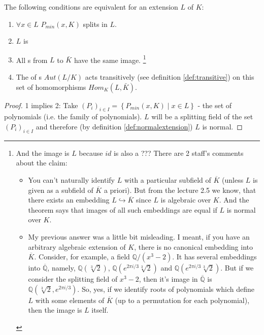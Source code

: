 \begin{theorem}
  The following conditions are equivalent for an extension $L$ of $K$:
  \begin{enumerate}
  \item $\forall x \in L$ $P_{min}\left(x, K\right)$ splits in $L$.
  \item $L$ is 
  \item All s from $L$ to $\bar{K}$ have the
    same image.
    \footnote{
      And the image is $L$ because $id$ is also a
      ??? There are 2 staff's comments about the claim:
      \begin{itemize}
      \item You can't naturally identify $L$ with a particular
        subfield of $\overline{K}$ (unless $L$ is given as a
        subfield of $\overline{K}$ a priori). But from the lecture
        2.5 we know, that there exists an embedding $L
        \hookrightarrow \overline{K}$ since $L$ is algebraic
        over $K$. And the theorem says that images of all such
        embeddings are equal if $L$ is normal over $K$. 
      \item My previous answer was a little bit misleading. I meant,
        if you have an arbitrary algebraic extension of $K$, there
        is no canonical embedding into $\overline{K}$. Consider, for
        example, a field $\mathbb{Q}/(x^3-2)$. It has several
        embeddings into $\overline{\mathbb{Q}}$,
        namely, $\mathbb{Q}(\sqrt[3]{2})$, $\mathbb{Q}(e^{2\pi
          i/3}\sqrt[3]{2})$ and $\mathbb{Q}(e^{2\pi
          i/3}\sqrt[3]{2})$. But if we consider the splitting field
        of $x^3-2$, then it's image in $\overline{\mathbb{Q}}$
        is $\mathbb{Q}(\sqrt[3]{2}, e^{2\pi i/3})$. So, yes, if we
        identify roots of polynomials which define $L$ with some
        elements of $\overline{K}$ (up to a permutation for each
        polynomial), then the image is $L$ itself. 
      \end{itemize}
    }
  \item The  of s
    $Aut\left(L/K\right)$ acts transitively (see definition
    \ref{def:transitive}) on this set of 
    homomorphisms $Hom_K\left(L, \bar{K}\right)$.
  \end{enumerate}
  \label{thm:lec5_3}
  \begin{proof}
    1 implies 2: Take
    $\left(P_i\right)_{i \in I} = \left\{P_{min}\left(x, K\right) \mid
    x \in L\right\}$ - the set of polynomials
    (i.e. the family of polynomials).
    $L$ will be a splitting field of the set $\left(P_i\right)_{i \in
      I}$ and therefore (by definition \ref{def:normalextension}) $L$ is normal.


\end{proof}
\end{theorem}
